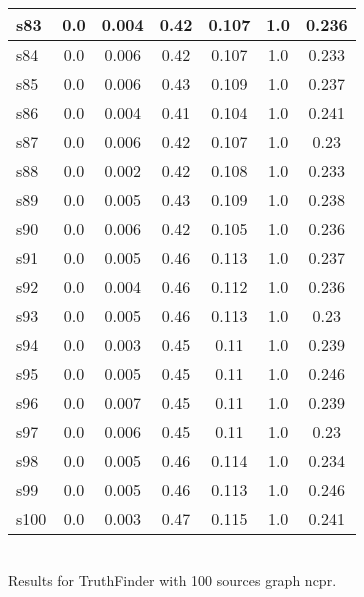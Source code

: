 \documentclass{article}
\begin{document}
\begin{tabular}{|l|c|c|c|c|c|c|}
\hline
s83 &0.0 & 0.004 & 0.42 & 0.107 & 1.0 & 0.236\\
\hline
s84 &0.0 & 0.006 & 0.42 & 0.107 & 1.0 & 0.233\\
\hline
s85 &0.0 & 0.006 & 0.43 & 0.109 & 1.0 & 0.237\\
\hline
s86 &0.0 & 0.004 & 0.41 & 0.104 & 1.0 & 0.241\\
\hline
s87 &0.0 & 0.006 & 0.42 & 0.107 & 1.0 & 0.23\\
\hline
s88 &0.0 & 0.002 & 0.42 & 0.108 & 1.0 & 0.233\\
\hline
s89 &0.0 & 0.005 & 0.43 & 0.109 & 1.0 & 0.238\\
\hline
s90 &0.0 & 0.006 & 0.42 & 0.105 & 1.0 & 0.236\\
\hline
s91 &0.0 & 0.005 & 0.46 & 0.113 & 1.0 & 0.237\\
\hline
s92 &0.0 & 0.004 & 0.46 & 0.112 & 1.0 & 0.236\\
\hline
s93 &0.0 & 0.005 & 0.46 & 0.113 & 1.0 & 0.23\\
\hline
s94 &0.0 & 0.003 & 0.45 & 0.11 & 1.0 & 0.239\\
\hline
s95 &0.0 & 0.005 & 0.45 & 0.11 & 1.0 & 0.246\\
\hline
s96 &0.0 & 0.007 & 0.45 & 0.11 & 1.0 & 0.239\\
\hline
s97 &0.0 & 0.006 & 0.45 & 0.11 & 1.0 & 0.23\\
\hline
s98 &0.0 & 0.005 & 0.46 & 0.114 & 1.0 & 0.234\\
\hline
s99 &0.0 & 0.005 & 0.46 & 0.113 & 1.0 & 0.246\\
\hline
s100 &0.0 & 0.003 & 0.47 & 0.115 & 1.0 & 0.241\\
\hline
\end{tabular}\\

\noindent Results for TruthFinder with 100 sources graph ncpr.
\end{document}
